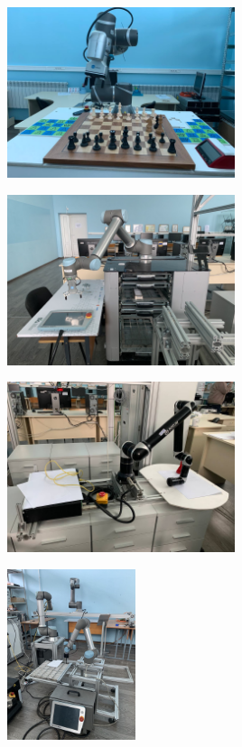  \begin{figure}[ht]
	\centering
\hspace*{\fill}%
	\begin{subfigure}[b]{0.49\textwidth}
        \centering
		\includegraphics[height=5cm,keepaspectratio]{images/chess.jpg}
		\caption{}
		\label{fig:chess}
	\end{subfigure}
 \hfill
	\begin{subfigure}[b]{0.49\textwidth}
        \centering
		\includegraphics[height=5cm,keepaspectratio]{images/маншир.jpg}
        \caption{}
		\label{fig:маншир}
	\end{subfigure}
 \hspace*{\fill}%
	\begin{subfigure}[b]{0.49\textwidth}
        \centering
		\includegraphics[height=5cm,keepaspectratio]{images/blr.jpg}
		\caption{}
		\label{fig:blr}
	\end{subfigure}
 \hfill
	\begin{subfigure}[b]{0.49\textwidth}
        \centering
		\includegraphics[height=5cm,keepaspectratio]{images/манипулятор.jpg}
        \caption{}
		\label{fig:манипулятор}
	\end{subfigure}


\end{figure}
